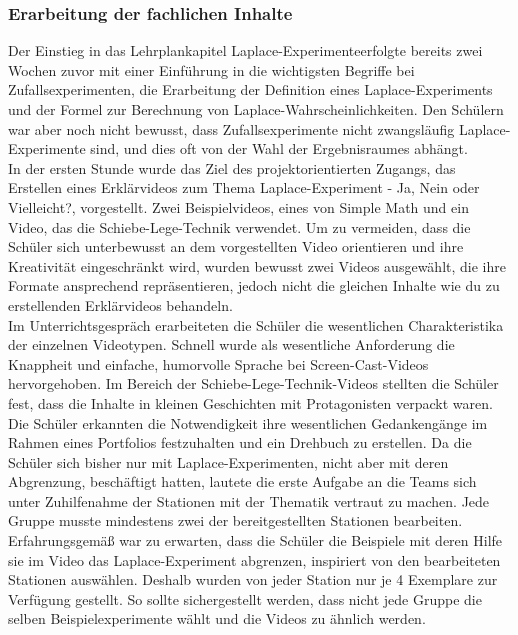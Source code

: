 \documentclass[a4paper,12pt,twoside=false]{scrartcl}
\begin{document}
\subsubsection{Erarbeitung der fachlichen Inhalte} 
Der Einstieg in das Lehrplankapitel \glqq Laplace-Experimente\grqq erfolgte bereits zwei Wochen zuvor mit einer Einführung in die wichtigsten Begriffe bei Zufallsexperimenten, die Erarbeitung der Definition eines Laplace-Experiments und der Formel zur Berechnung von Laplace-Wahrscheinlichkeiten. Den Schülern war aber noch nicht bewusst, dass Zufallsexperimente nicht zwangsläufig Laplace-Experimente sind, und dies oft von der Wahl der Ergebnisraumes abhängt. \\ In der ersten Stunde wurde das Ziel des projektorientierten Zugangs, das Erstellen eines Erklärvideos zum Thema \glqq Laplace-Experiment - Ja, Nein oder Vielleicht?\grqq, vorgestellt. Zwei Beispielvideos, eines von Simple Math %
und ein Video, das die Schiebe-Lege-Technik verwendet. Um zu vermeiden, dass die Schüler sich unterbewusst an dem vorgestellten Video orientieren und ihre Kreativität eingeschränkt wird, wurden bewusst zwei Videos ausgewählt, die ihre Formate ansprechend repräsentieren, jedoch nicht die gleichen Inhalte wie du zu erstellenden Erklärvideos behandeln. \\
Im Unterrichtsgespräch erarbeiteten die Schüler die wesentlichen Charakteristika der einzelnen Videotypen. Schnell wurde als wesentliche Anforderung die Knappheit und einfache, humorvolle Sprache bei Screen-Cast-Videos hervorgehoben. Im Bereich der Schiebe-Lege-Technik-Videos stellten die Schüler fest, dass die Inhalte in kleinen Geschichten mit Protagonisten verpackt waren. Die Schüler erkannten die Notwendigkeit ihre wesentlichen Gedankengänge im Rahmen eines Portfolios festzuhalten und ein Drehbuch zu erstellen. Da die Schüler sich bisher nur mit Laplace-Experimenten, nicht aber mit deren Abgrenzung, beschäftigt hatten, lautete die erste Aufgabe an die Teams sich unter Zuhilfenahme der Stationen mit der Thematik vertraut zu machen. Jede Gruppe musste mindestens zwei der bereitgestellten Stationen bearbeiten. Erfahrungsgemäß war zu erwarten, dass die Schüler die Beispiele mit deren Hilfe sie im Video das Laplace-Experiment abgrenzen, inspiriert von den bearbeiteten Stationen auswählen. Deshalb wurden von jeder Station nur je 4 Exemplare zur Verfügung gestellt. So sollte sichergestellt werden, dass nicht jede Gruppe die selben Beispielexperimente wählt und die Videos zu ähnlich werden.\\
\end{document}
